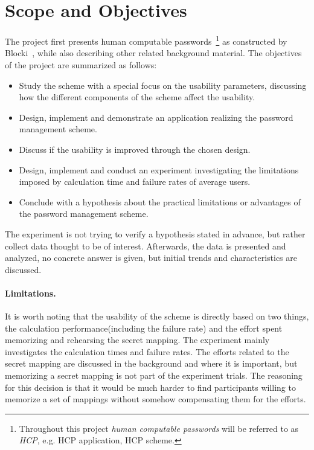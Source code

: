 
\section{Scope and Objectives}
The project first presents human computable passwords~\footnote{Throughout this project \emph{human computable passwords} will be referred to as \emph{HCP}, e.g. HCP application, HCP scheme.} as constructed by Blocki~\cite{hcp-blocki}, while also describing other related background material. The objectives of the project are summarized as follows:
\begin{itemize}
    \item Study the scheme with a special focus on the usability parameters, discussing how the different components of the scheme affect the usability.
    \item Design, implement and demonstrate an application realizing the password management scheme.
    \item Discuss if the usability is improved through the chosen design. 
    \item Design, implement and conduct an experiment investigating the limitations imposed by calculation time and failure rates of average users.
    \item Conclude with a hypothesis about the practical limitations or advantages of the password management scheme.
\end{itemize}
\par The experiment is not trying to verify a hypothesis stated in advance, but rather collect data thought to be of interest. Afterwards, the data is presented and analyzed, no concrete answer is given, but initial trends and characteristics are discussed.
\paragraph{Limitations.}
It is worth noting that the usability of the scheme is directly based on two things, the calculation performance(including the failure rate) and the effort spent memorizing and rehearsing the secret mapping. The experiment mainly investigates the calculation times and failure rates. The efforts related to the secret mapping are discussed in the background and where it is important, but memorizing a secret mapping is not part of the experiment trials. The reasoning for this decision is that it would be much harder to find participants willing to memorize a set of mappings without somehow compensating them for the efforts.



